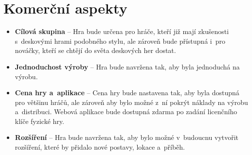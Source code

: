 \section{Komerční aspekty}
\label{sec:req_commercial}

\begin{itemize}
    \item \textbf{Cílová skupina} --
        Hra bude určena pro hráče, kteří již mají zkušenosti s~deskovými hrami podobného stylu, ale zároveň bude přístupná i~pro nováčky, kteří se chtějí do světa deskových her dostat.
    \item \textbf{Jednoduchost výroby} --
        Hra bude navržena tak, aby byla jednoduchá na výrobu.
    \item \textbf{Cena hry a~aplikace} --
        Cena hry bude nastavena tak, aby byla dostupná pro většinu hráčů, ale zároveň aby bylo možné z~ní pokrýt náklady na výrobu a~distribuci. Webová aplikace bude dostupná zdarma po zadání licenčního klíče fyzické hry.
    \item \textbf{Rozšíření} --
        Hra bude navržena tak, aby bylo možné v~budoucnu vytvořit rozšíření, které by přidalo nové postavy, lokace a~příběh.
\end{itemize}